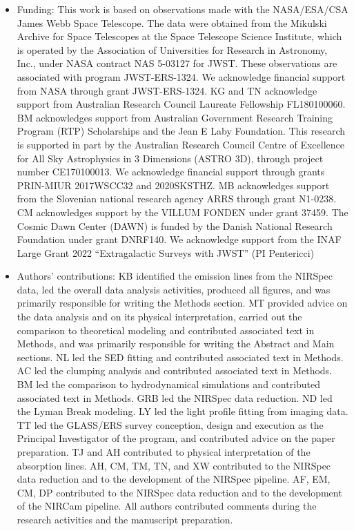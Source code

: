 \documentclass[sn-mathphys]{sn-jnl}%
\theoremstyle{thmstyleone}%
\theoremstyle{thmstyletwo}%
\theoremstyle{thmstylethree}%
\begin{document}
\begin{itemize}

\item Funding: This work is based on observations made with the NASA/ESA/CSA James Webb Space Telescope. The data were obtained from the Mikulski Archive for Space Telescopes at the Space Telescope Science Institute, which is operated by the Association of Universities for Research in Astronomy, Inc., under NASA contract NAS 5-03127 for JWST. These observations are associated with program JWST-ERS-1324. We acknowledge financial support from NASA through grant JWST-ERS-1324.  KG and TN acknowledge support from Australian Research Council Laureate Fellowship FL180100060. BM acknowledges support from Australian Government Research Training Program (RTP) Scholarships and the Jean E Laby Foundation. This research is supported in part by the Australian Research Council Centre of Excellence for All Sky Astrophysics in 3 Dimensions (ASTRO 3D), through project number CE170100013. We acknowledge financial support through grants PRIN-MIUR 2017WSCC32 and 2020SKSTHZ. MB acknowledges support from the Slovenian national research agency ARRS through grant N1-0238. CM acknowledges support by the VILLUM FONDEN under grant 37459. The Cosmic Dawn Center (DAWN) is funded by the Danish National Research Foundation under grant DNRF140. We acknowledge support from the INAF Large Grant 2022 “Extragalactic Surveys with JWST”  (PI Pentericci)

\item Authors' contributions: KB identified the emission lines from the NIRSpec data, led the overall data analysis activities, produced all figures, and was primarily responsible for writing the Methods section. MT provided advice on the data analysis and on its physical interpretation, carried out the comparison to theoretical modeling and contributed associated text in Methods, and was primarily responsible for writing the Abstract and Main sections. NL led the SED fitting and contributed associated text in Methods. AC led the clumping analysis and contributed associated text in Methods. BM led the comparison to hydrodynamical simulations and contributed associated text in Methods. GRB led the NIRSpec data reduction. ND led the Lyman Break modeling. LY led the light profile fitting from imaging data. TT led the GLASS/ERS survey conception, design and execution as the Principal Investigator of the program, and contributed advice on the paper preparation. TJ and AH contributed to physical interpretation of the absorption lines. AH, CM, TM, TN, and XW contributed to the NIRSpec data reduction and to the development of the NIRSpec pipeline. AF, EM, CM, DP contributed to the NIRSpec data reduction and to the development of the NIRCam pipeline. All authors contributed comments during the research activities and the manuscript preparation.    

\end{itemize}
\end{document}
